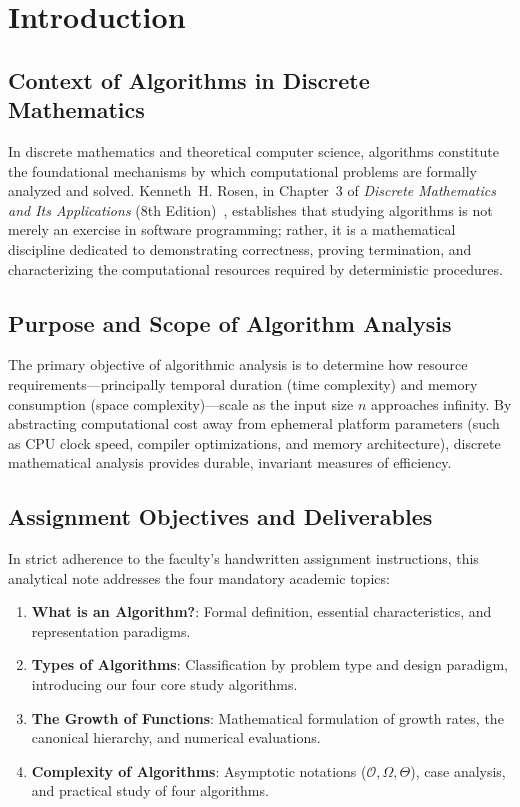 \documentclass[11pt,a4paper,oneside]{report}
\theoremstyle{definition}
\begin{document}
\newpage
\setcounter{page}{1}

\chapter{Introduction}
\label{chap:introduction}

\section{Context of Algorithms in Discrete Mathematics}
In discrete mathematics and theoretical computer science, algorithms constitute the foundational mechanisms by which computational problems are formally analyzed and solved. Kenneth~H. Rosen, in Chapter~3 of \emph{Discrete Mathematics and Its Applications} (8th Edition)~\cite{Rosen2019}, establishes that studying algorithms is not merely an exercise in software programming; rather, it is a mathematical discipline dedicated to demonstrating correctness, proving termination, and characterizing the computational resources required by deterministic procedures.

\section{Purpose and Scope of Algorithm Analysis}
The primary objective of algorithmic analysis is to determine how resource requirements---principally temporal duration (time complexity) and memory consumption (space complexity)---scale as the input size $n$ approaches infinity. By abstracting computational cost away from ephemeral platform parameters (such as CPU clock speed, compiler optimizations, and memory architecture), discrete mathematical analysis provides durable, invariant measures of efficiency.

\section{Assignment Objectives and Deliverables}
In strict adherence to the faculty's handwritten assignment instructions, this analytical note addresses the four mandatory academic topics:
\begin{enumerate}
    \item \textbf{What is an Algorithm?}: Formal definition, essential characteristics, and representation paradigms.
    \item \textbf{Types of Algorithms}: Classification by problem type and design paradigm, introducing our four core study algorithms.
    \item \textbf{The Growth of Functions}: Mathematical formulation of growth rates, the canonical hierarchy, and numerical evaluations.
    \item \textbf{Complexity of Algorithms}: Asymptotic notations ($\mathcal{O}, \Omega, \Theta$), case analysis, and practical study of four algorithms.
\end{enumerate}
\end{document}
